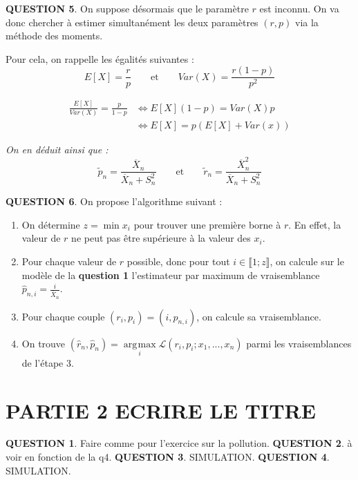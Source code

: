 \documentclass[a4paper,11pt]{article}
\DeclareMathOperator*{\argmax}{\arg\!\max}
\newcommand{\quest}[1]{\small\textbf{#1}\normalsize}
\theoremstyle{nonumberplain}
\theoremstyle{nonumberplain}
\theoremstyle{nonumberplain}
\theoremstyle{nonumberplain}
\begin{document}
      \bigskip
      \medskip
      \quest{QUESTION 5}. On suppose désormais que le paramètre $r$ est inconnu.
      On va donc chercher à estimer simultanément les deux paramètres $(r, p)$ via la méthode des moments.

      \medskip
      Pour cela, on rappelle les égalités suivantes :
      \[
            E[X] = \frac{r}{p}\qquad\text{et}\qquad Var(X) = \frac{r (1 - p)}{p^2}
      \]

      \begin{calculs}
          \vspace{-2ex}
          \begin{equation*}
          \begin{split}
              \frac{E[X]}{Var(X)} = \frac{p}{1 - p} & \iff E[X](1 - p) = Var(X) p \\
                                                    & \iff E[X] = p(E[X] + Var(x))
          \end{split}
          \end{equation*}

          \emph{On en déduit ainsi que :}
          \[
                \tilde{p}_n = \frac{\overline{X}_n}{\overline{X}_n + S_n^2}\qquad\text{et}\qquad \tilde{r}_n = \frac{\overline{X}_n^2}{\overline{X}_n + S_n^2}
          \]
      \end{calculs}

      \medskip
      \bigskip
      \quest{QUESTION 6}. On propose l'algorithme suivant :

        \begin{enumerate}
            \item On détermine $z = \min x_i$ pour trouver une première borne à $r$.\newline
            En effet, la valeur de $r$ ne peut pas être supérieure à la valeur des $x_i$. \newline

            \item Pour chaque valeur de $r$ possible, donc pour tout $i \in \llbracket 1; z \rrbracket$, on calcule
            sur le modèle de la \textbf{question 1} l'estimateur par maximum de vraisemblance $\hat{p}_{n, i} = \frac{i}{\overline{X}_n}$.\newline

            \item Pour chaque couple $(r_i, p_i) = (i, \hat{p}_{n, i})$, on calcule sa vraisemblance.\newline

            \item On trouve $(\hat{r}_{n}, \hat{p}_{n}) = \argmax\limits_{i} \mathcal{L}(r_i, p_i; x_1, ..., x_n)$ parmi les vraisemblances de l'étape 3.
        \end{enumerate}

    \newpage
    \section{PARTIE 2 ECRIRE LE TITRE}

      \quest{QUESTION 1}. Faire comme pour l'exercice sur la pollution.
      \quest{QUESTION 2}. à voir en fonction de la q4.
      \quest{QUESTION 3}. SIMULATION.
      \quest{QUESTION 4}. SIMULATION.
\end{document}
